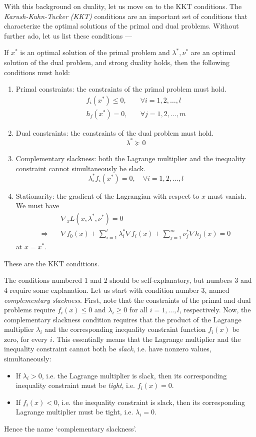 \documentclass[a4paper]{article}
\theoremstyle{definition}
\begin{document}
With this background on duality, let us move on to the KKT conditions.
The \textit{Karush-Kuhn-Tucker (KKT)} conditions are an important set of conditions that characterize the optimal solutions of the primal and dual problems.
Without further ado, let us list these conditions ---

If $x^*$ is an optimal solution of the primal problem and $\lambda^*, \nu^*$ are an optimal solution of the dual problem, and strong duality holds, then the following conditions must hold:
\begin{enumerate}
	\item Primal constraints: the constraints of the primal problem must hold.
		\begin{align*}
			f_i(x^*) \leq 0, & \quad \forall i = 1, 2, \dots, l \\
			h_j(x^*) = 0, & \quad \forall j = 1, 2, \dots, m
		\end{align*}
	\item Dual constraints: the constraints of the dual problem must hold.
		\begin{equation*}
			\lambda^* \succeq 0
		\end{equation*}
	\item Complementary slackness: both the Lagrange multiplier and the inequality constraint cannot simultaneously be slack.
		\begin{equation*}
			\lambda_i^* f_i(x^*) = 0, \quad \forall i = 1, 2, \dots, l
		\end{equation*}
	\item Stationarity: the gradient of the Lagrangian with respect to $x$ must vanish. We must have
		\begin{align*}
			& \nabla_x L(x, \lambda^*, \nu^*) = 0 \\
			\Rightarrow \quad & \nabla f_0(x) + \sum_{i=1}^l \lambda_i^* \nabla f_i(x) + \sum_{j=1}^m \nu_j^* \nabla h_j(x) = 0
		\end{align*}
		at $x = x^*$.
\end{enumerate}
These are the KKT conditions.

The conditions numbered 1 and 2 should be self-explanatory, but numbers 3 and 4 require some explanation.
Let us start with condition number 3, named \textit{complementary slackness}.
First, note that the constraints of the primal and dual problems require $f_i(x) \leq 0$ and $\lambda_i \geq 0$ for all $i = 1, \dots, l$, respectively.
Now, the complementary slackness condition requires that the product of the Lagrange multiplier $\lambda_i$ and the corresponding inequality constraint function $f_i(x)$ be zero, for every $i$.
This essentially means that the Lagrange multiplier and the inequality constraint cannot both be \textit{slack}, i.e. have nonzero values, simultaneously:
\begin{itemize}
	\item If $\lambda_i > 0$, i.e. the Lagrange multiplier is slack, then its corresponding inequality constraint must be \textit{tight}, i.e. $f_i(x) = 0$.
	\item If $f_i(x) < 0$, i.e. the inequality constraint is slack, then its corresponding Lagrange multiplier must be tight, i.e. $\lambda_i = 0$.
\end{itemize}
Hence the name `complementary slackness'.
\end{document}
